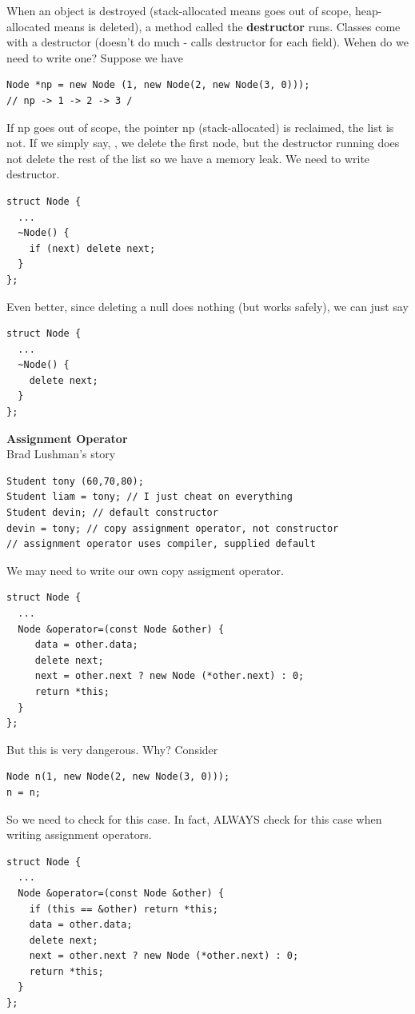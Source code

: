 \documentclass[english, 11pt]{article}
\begin{document}
When an object is destroyed (stack-allocated means goes out of scope, heap-allocated means is deleted), a method called the \textbf{destructor} runs. Classes come with a destructor (doesn't do much - calls destructor for each field). Wehen do we need to write one?
Suppose we have
\begin{lstlisting}
Node *np = new Node (1, new Node(2, new Node(3, 0)));
// np -> 1 -> 2 -> 3 /
\end{lstlisting}
If np goes out of scope, the pointer np (stack-allocated) is reclaimed, the list is not. If we simply say, , we delete the first node, but the destructor running does not delete the rest of the list so we have a memory leak. We need to write  destructor.
\begin{lstlisting}
struct Node {
  ...
  ~Node() {
    if (next) delete next;
  }
};
\end{lstlisting}
Even better, since deleting a null does nothing (but works safely), we can just say
\begin{lstlisting}
struct Node {
  ...
  ~Node() {
    delete next;
  }
};
\end{lstlisting}
\textbf{Assignment Operator} \\
Brad Lushman's story
\begin{lstlisting}
Student tony (60,70,80);
Student liam = tony; // I just cheat on everything
Student devin; // default constructor
devin = tony; // copy assignment operator, not constructor
// assignment operator uses compiler, supplied default
\end{lstlisting}
We may need to write our own copy assigment operator.
\begin{lstlisting}
struct Node {
  ...
  Node &operator=(const Node &other) {
     data = other.data;
     delete next;
     next = other.next ? new Node (*other.next) : 0;
     return *this;
  }
};
\end{lstlisting}
But this is very dangerous. Why? Consider
\begin{lstlisting}
Node n(1, new Node(2, new Node(3, 0)));
n = n;
\end{lstlisting}
So we need to check for this case. In fact, ALWAYS check for this case when writing assignment operators.
\begin{lstlisting}
struct Node {
  ...
  Node &operator=(const Node &other) {
    if (this == &other) return *this;
    data = other.data;
    delete next;
    next = other.next ? new Node (*other.next) : 0;
    return *this;
  }
};
\end{lstlisting}
\end{document}
